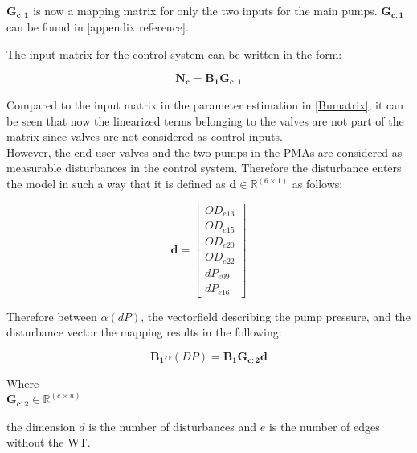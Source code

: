 $\pmb{G_{c;1}}$ is now a mapping matrix for only the two inputs for the main pumps. $\pmb{G_{c;1}}$ can be found in [appendix reference].

The input matrix for the control system can be written in the form: 

\begin{equation}
  \pmb{N_c} =  \pmb{B_1}\pmb{G_{c;1}}  
\label{inputmatrix_control}	
\end{equation}

Compared to the input matrix in the parameter estimation in \eqref{Bumatrix}, it can be seen that now the linearized terms belonging to the valves are not part of the matrix since valves are not considered as control inputs. 
\\
However, the end-user valves and the two pumps in the PMAs are considered as measurable disturbances in the control system. Therefore the disturbance enters the model in such a way that it is defined as $\pmb{d} \in \pmb{\mathbb{R}}^{(6 \times 1)}$ as follows: 

\begin{equation}
\pmb{d} =
\begin{bmatrix} 
OD_{e13} \\
OD_{e15} \\
OD_{e20} \\
OD_{e22} \\
dP_{e09} \\
dP_{e16} 
\label{disturbancevector_control}
\end{bmatrix} 
\end{equation}

Therefore between $\alpha(dP)$, the vectorfield describing the pump pressure, and the disturbance vector the mapping results in the following:

\begin{equation}
\pmb{B_1} \alpha(DP) = \pmb{B_1} \pmb{G_{c;2}} \pmb{d}
\label{mapping_PMA}
\end{equation}


\begin{minipage}[t]{0.30\textwidth}
Where\\
\hspace*{8mm} $\pmb{G_{c;2}} \in \pmb{\mathbb{R}}^{(e \times u)} $ 
\end{minipage}
\begin{minipage}[t]{0.68\textwidth}
\vspace*{2mm}
the dimension $d$ is the number of disturbances and $e$ is the number of edges without the WT. 
\end{minipage} 

